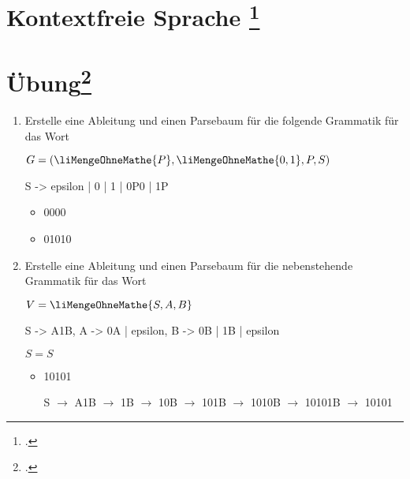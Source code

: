 \documentclass{lehramt-informatik-aufgabe}
\begin{document}
\section{Kontextfreie Sprache
\footcite{theo:fs:2}}

%

\section{Übung\footcite[Seite 18]{theo:fs:2}}

\let\m=\liMengeOhneMathe

\begin{enumerate}
\item Erstelle eine Ableitung und einen Parsebaum für die folgende
Grammatik für das Wort

$G = ( \m{P} , \m{ 0, 1 }, P, S)$

\begin{liProduktionsRegeln}
S -> epsilon | 0 | 1 | 0P0 | 1P
\end{liProduktionsRegeln}

\begin{itemize}
\item 0000
\item 01010
\end{itemize}

\item Erstelle eine Ableitung und einen Parsebaum für die nebenstehende
Grammatik für das Wort

$V = \m{ S, A, B }$


\begin{liProduktionsRegeln}
S -> A1B,
A -> 0A | epsilon,
B -> 0B | 1B | epsilon
\end{liProduktionsRegeln}

$S = S$

\begin{itemize}
\item 10101

\begin{liAntwort}
\def\p{ $\rightarrow$ }

S \p A1B \p 1B \p 10B \p 101B \p 1010B \p 10101B \p 10101

\end{liAntwort}


\end{itemize}
\end{enumerate}
\end{document}
